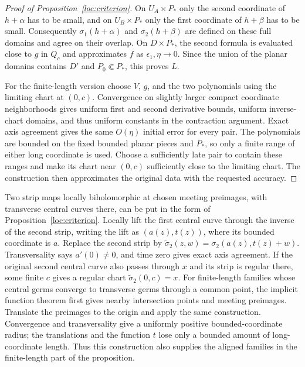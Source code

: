 \begin{proof}[Proof of Proposition~\ref{loc:criterion}]
On $U_A\times P_*$ only the second coordinate of $h+\alpha$ has
to be small, and on $U_B\times P_*$ only the first coordinate
of $h+\beta$ has to be small. Consequently
$\sigma_1(h+\alpha)$ and $\sigma_2(h+\beta)$ are defined on
these full domains and agree on their overlap. On $D\times P_*$,
the second formula is evaluated close to $g$ in $Q_c$ and
approximates $f$ as $\epsilon_1,\eta\to0$. Since the union of the
planar domains contains $D'$ and $P_0\Subset P_*$, this proves $L$.

For the finite-length version choose $V$, $g$, and the two
polynomials using the limiting chart at $(0,c)$. Convergence on
slightly larger compact coordinate neighborhoods gives uniform
first and second derivative bounds, uniform inverse-chart domains,
and thus uniform constants in the contraction argument.
Exact axis agreement gives the same $O(\eta)$ initial error for
every pair. The polynomials are bounded on the fixed bounded
planar pieces and $\overline P_*$, so only a finite range of either
long coordinate is used. Choose a sufficiently late pair to contain
these ranges and make its chart near $(0,c)$ sufficiently close to
the limiting chart. The construction then approximates the original
data with the requested accuracy.
\end{proof}

\begin{remark}\label{loc:alignment}
Two strip maps locally biholomorphic at chosen meeting preimages,
with transverse central curves there, can be put in the form of
Proposition~\ref{loc:criterion}. Locally lift the
first central curve through the inverse of the second strip, writing
the lift as $(a(z),t(z))$, where its bounded coordinate is $a$.
Replace the second strip by
$\widetilde\sigma_2(z,w)=\sigma_2(a(z),t(z)+w)$.
Transversality says $a'(0)\ne0$, and time zero gives exact axis
agreement. If the original second central curve also passes through
$x$ and its strip is regular there, some finite $c$ gives a regular
chart $\widetilde\sigma_2(0,c)=x$.
For finite-length families whose central germs converge to transverse
germs through a common point, the implicit function theorem first
gives nearby intersection points and meeting preimages. Translate
the preimages to the origin and apply the same construction.
Convergence and transversality give a uniformly positive
bounded-coordinate radius; the translations and the function $t$
lose only a bounded amount of long-coordinate length. Thus this
construction also supplies the aligned families in the finite-length
part of the proposition.
\end{remark}

